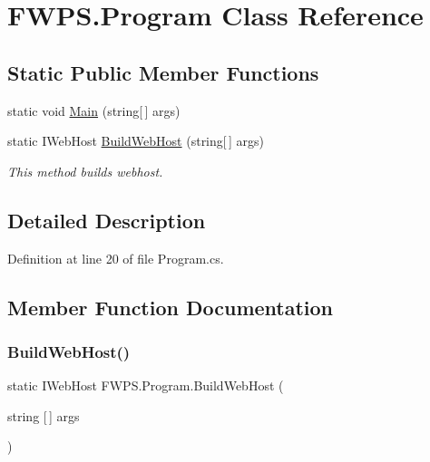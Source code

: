 \hypertarget{class_f_w_p_s_1_1_program}{}\section{F\+W\+P\+S.\+Program Class Reference}
\label{class_f_w_p_s_1_1_program}
\subsection*{Static Public Member Functions}
\begin{DoxyCompactItemize}
\item 
static void \mbox{\hyperlink{class_f_w_p_s_1_1_program_a206ed562ef064d331e9d98f52cfb9659}{Main}} (string\mbox{[}$\,$\mbox{]} args)
\item 
static I\+Web\+Host \mbox{\hyperlink{class_f_w_p_s_1_1_program_a113185fb9691d21b059268bf1f05dd8d}{Build\+Web\+Host}} (string\mbox{[}$\,$\mbox{]} args)
\begin{DoxyCompactList}\small\item\em This method builds webhost. \end{DoxyCompactList}\end{DoxyCompactItemize}


\subsection{Detailed Description}


Definition at line 20 of file Program.\+cs.



\subsection{Member Function Documentation}
\mbox{\label{class_f_w_p_s_1_1_program_a113185fb9691d21b059268bf1f05dd8d}} 
\subsubsection{\texorpdfstring{Build\+Web\+Host()}{BuildWebHost()}}
{\footnotesize\ttfamily static I\+Web\+Host F\+W\+P\+S.\+Program.\+Build\+Web\+Host (\begin{DoxyParamCaption}\item[{string \mbox{[}$\,$\mbox{]}}]{args }\end{DoxyParamCaption})\hspace{0.3cm}{\ttfamily [static]}}



